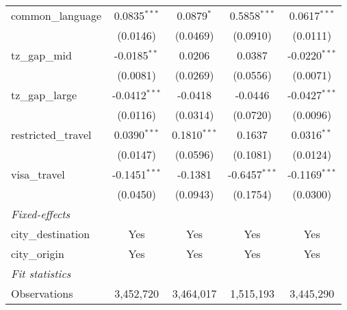 \begin{tabular}{lcccc}
   common\_language                  & 0.0835$^{***}$                 & 0.0879$^{*}$                      & 0.5858$^{***}$                & 0.0617$^{***}$\\   
                                     & (0.0146)                       & (0.0469)                          & (0.0910)                      & (0.0111)\\   
   tz\_gap\_mid                      & -0.0185$^{**}$                 & 0.0206                            & 0.0387                        & -0.0220$^{***}$\\   
                                     & (0.0081)                       & (0.0269)                          & (0.0556)                      & (0.0071)\\   
   tz\_gap\_large                    & -0.0412$^{***}$                & -0.0418                           & -0.0446                       & -0.0427$^{***}$\\   
                                     & (0.0116)                       & (0.0314)                          & (0.0720)                      & (0.0096)\\   
   restricted\_travel                & 0.0390$^{***}$                 & 0.1810$^{***}$                    & 0.1637                        & 0.0316$^{**}$\\   
                                     & (0.0147)                       & (0.0596)                          & (0.1081)                      & (0.0124)\\   
   visa\_travel                      & -0.1451$^{***}$                & -0.1381                           & -0.6457$^{***}$               & -0.1169$^{***}$\\   
                                     & (0.0450)                       & (0.0943)                          & (0.1754)                      & (0.0300)\\   
   \midrule
   \emph{Fixed-effects}\\
   city\_destination                 & Yes                            & Yes                               & Yes                           & Yes\\  
   city\_origin                      & Yes                            & Yes                               & Yes                           & Yes\\  
   \midrule
   \emph{Fit statistics}\\
   Observations                      & 3,452,720                      & 3,464,017                         & 1,515,193                     & 3,445,290\\  

\end{tabular}
